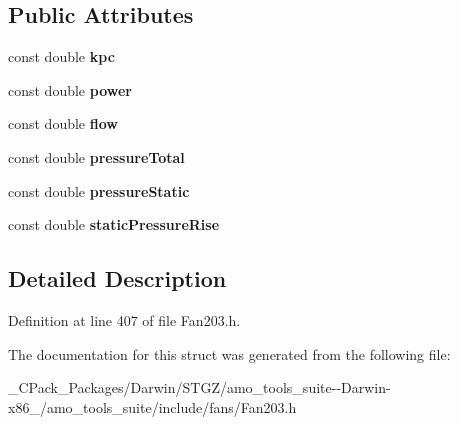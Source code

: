 \subsection*{Public Attributes}
\begin{DoxyCompactItemize}
\item 
\mbox{\label{struct_fan203_1_1_results_af7807d80fca26d0b285bc64724955bef}} 
const double {\bfseries kpc}
\item 
\mbox{\label{struct_fan203_1_1_results_a9349844e20eff206f02af8966e2e5fac}} 
const double {\bfseries power}
\item 
\mbox{\label{struct_fan203_1_1_results_ac33d08fec0aca62c54453533afd56138}} 
const double {\bfseries flow}
\item 
\mbox{\label{struct_fan203_1_1_results_a1badf6a2ca70b8a8e5b5a8434bd616cd}} 
const double {\bfseries pressure\+Total}
\item 
\mbox{\label{struct_fan203_1_1_results_aafd803a2134247f32b4da2f6c456e003}} 
const double {\bfseries pressure\+Static}
\item 
\mbox{\label{struct_fan203_1_1_results_a78f134ec5411707138395bfd17e2f34e}} 
const double {\bfseries static\+Pressure\+Rise}
\end{DoxyCompactItemize}


\subsection{Detailed Description}


Definition at line 407 of file Fan203.\+h.



The documentation for this struct was generated from the following file\+:\begin{DoxyCompactItemize}
\item 
\+\_\+\+C\+Pack\+\_\+\+Packages/\+Darwin/\+S\+T\+G\+Z/amo\+\_\+tools\+\_\+suite-\/-\/\+Darwin-\/x86\+\_/amo\+\_\+tools\+\_\+suite/include/fans/Fan203.\+h\end{DoxyCompactItemize}

